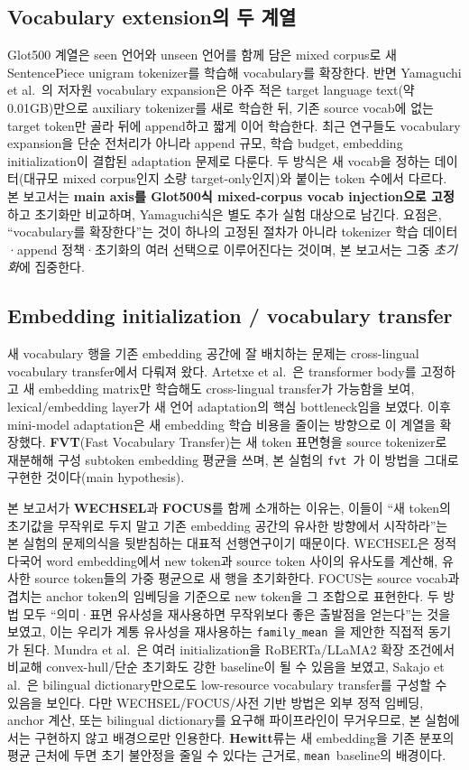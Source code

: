 \documentclass[11pt,a4paper]{article}
\newcommand{\meanm}{\texttt{mean}}
\newcommand{\fvt}{\texttt{fvt}}
\newcommand{\famm}{\texttt{family\_mean}}
\begin{document}
\subsection{Vocabulary extension의 두 계열}
Glot500 계열은 seen 언어와 unseen 언어를 함께 담은 mixed corpus로 새 SentencePiece unigram tokenizer를 학습해 vocabulary를 확장한다. 반면 Yamaguchi et al.\ 의 저자원 vocabulary expansion은 아주 적은 target language text(약 0.01GB)만으로 auxiliary tokenizer를 새로 학습한 뒤, 기존 source vocab에 없는 target token만 골라 뒤에 append하고 짧게 이어 학습한다. 최근 연구들도 vocabulary expansion을 단순 전처리가 아니라 append 규모, 학습 budget, embedding initialization이 결합된 adaptation 문제로 다룬다\cite{yamaguchi,mundra2024,lin2025}. 두 방식은 새 vocab을 정하는 데이터(대규모 mixed corpus인지 소량 target-only인지)와 붙이는 token 수에서 다르다. 본 보고서는 \textbf{main axis를 Glot500식 mixed-corpus vocab injection으로 고정}하고 초기화만 비교하며, Yamaguchi식은 별도 추가 실험 대상으로 남긴다. 요점은, ``vocabulary를 확장한다''는 것이 하나의 고정된 절차가 아니라 tokenizer 학습 데이터·append 정책·초기화의 여러 선택으로 이루어진다는 것이며, 본 보고서는 그중 \emph{초기화}에 집중한다.

\subsection{Embedding initialization / vocabulary transfer}
새 vocabulary 행을 기존 embedding 공간에 잘 배치하는 문제는 cross-lingual vocabulary transfer에서 다뤄져 왔다. Artetxe et al.\ 은 transformer body를 고정하고 새 embedding matrix만 학습해도 cross-lingual transfer가 가능함을 보여, lexical/embedding layer가 새 언어 adaptation의 핵심 bottleneck임을 보였다\cite{artetxe2020}. 이후 mini-model adaptation은 새 embedding 학습 비용을 줄이는 방향으로 이 계열을 확장했다\cite{marchisio2023}. \textbf{FVT}(Fast Vocabulary Transfer)는 새 token 표면형을 source tokenizer로 재분해해 구성 subtoken embedding 평균을 쓰며, 본 실험의 \fvt\ 가 이 방법을 그대로 구현한 것이다(main hypothesis).

본 보고서가 \textbf{WECHSEL}과 \textbf{FOCUS}를 함께 소개하는 이유는, 이들이 ``새 token의 초기값을 무작위로 두지 말고 기존 embedding 공간의 유사한 방향에서 시작하라''는 본 실험의 문제의식을 뒷받침하는 대표적 선행연구이기 때문이다. WECHSEL은 정적 다국어 word embedding에서 new token과 source token 사이의 유사도를 계산해, 유사한 source token들의 가중 평균으로 새 행을 초기화한다. FOCUS는 source vocab과 겹치는 anchor token의 임베딩을 기준으로 new token을 그 조합으로 표현한다. 두 방법 모두 ``의미·표면 유사성을 재사용하면 무작위보다 좋은 출발점을 얻는다''는 것을 보였고, 이는 우리가 계통 유사성을 재사용하는 \famm\ 을 제안한 직접적 동기가 된다. Mundra et al.\ 은 여러 initialization을 RoBERTa/LLaMA2 확장 조건에서 비교해 convex-hull/단순 초기화도 강한 baseline이 될 수 있음을 보였고, Sakajo et al.\ 은 bilingual dictionary만으로도 low-resource vocabulary transfer를 구성할 수 있음을 보인다\cite{mundra2024,sakajo2025}. 다만 WECHSEL/FOCUS/사전 기반 방법은 외부 정적 임베딩, anchor 계산, 또는 bilingual dictionary를 요구해 파이프라인이 무거우므로, 본 실험에서는 구현하지 않고 배경으로만 인용한다. \textbf{Hewitt}류는 새 embedding을 기존 분포의 평균 근처에 두면 초기 불안정을 줄일 수 있다는 근거로, \meanm\ baseline의 배경이다.
\end{document}
